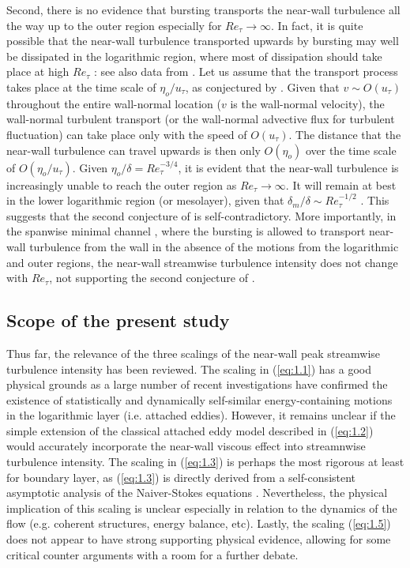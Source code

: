 \documentclass{jfm}
\begin{document}
Second, there is no evidence that bursting transports the near-wall turbulence all the way up to the outer region especially for $Re_\tau \rightarrow \infty$. In fact, it is quite possible that the near-wall turbulence transported upwards by bursting may well be dissipated in the logarithmic region, where most of dissipation should take place at high $Re_\tau$ \cite[]{Tennekes1967}: see also data from \cite{Lee2015,Lee2019}. Let us assume that the transport process takes place at the time scale of $\eta_o/u_\tau$, as conjectured by \cite{Chen2021}. Given that $v \sim O(u_\tau)$ throughout the entire wall-normal location ($v$ is the wall-normal velocity), the wall-normal turbulent transport (or the wall-normal advective flux for turbulent fluctuation) can take place only with the speed of $O(u_\tau)$. The distance that the near-wall turbulence can travel upwards is then only $O(\eta_o)$ over the time scale of $O(\eta_o/u_\tau)$. Given $\eta_o/\delta=Re_\tau^{-3/4}$, it is evident that the near-wall turbulence is increasingly unable to reach the outer region as $Re_\tau \rightarrow \infty$. It will remain at best in the lower logarithmic region (or mesolayer), given that $\delta_m/\delta \sim Re_\tau^{-1/2}$ \cite[$\delta_m$ is the upper boundary of the mesolayer; see][]{Afzal1982,Sreenivasan1997,Wei2005}. This suggests that the second conjecture of \cite{Chen2021} is self-contradictory. More importantly, in the spanwise minimal channel \cite[e.g.][]{Hwang2013}, where the bursting is allowed to transport near-wall turbulence from the wall in the absence of the motions from the logarithmic and outer regions, the near-wall streamwise turbulence intensity does not change with $Re_\tau$, not supporting the second conjecture of \cite{Chen2021}.

\subsection{Scope of the present study}\label{sec:1.4}

Thus far, the relevance of the three scalings of the near-wall peak streamwise turbulence intensity has been reviewed. The scaling in (\ref{eq:1.1}) has a good physical grounds as a large number of recent investigations have confirmed the existence of statistically and dynamically self-similar energy-containing motions in the logarithmic layer (i.e. attached eddies). However, it remains unclear if the simple extension of the classical attached eddy model described in (\ref{eq:1.2}) would accurately incorporate the near-wall viscous effect into streamnwise turbulence intensity. The scaling in (\ref{eq:1.3}) is perhaps the most rigorous at least for boundary layer, as (\ref{eq:1.3}) is directly derived from a self-consistent asymptotic analysis of the Naiver-Stokes equations \cite[]{Monkewitz2015}. Nevertheless, the physical implication of this scaling is unclear especially in relation to the dynamics of the flow (e.g. coherent structures, energy balance, etc). Lastly, the scaling (\ref{eq:1.5}) does not appear to have strong supporting physical evidence, allowing for some critical counter arguments with a room for a further debate.
\end{document}
